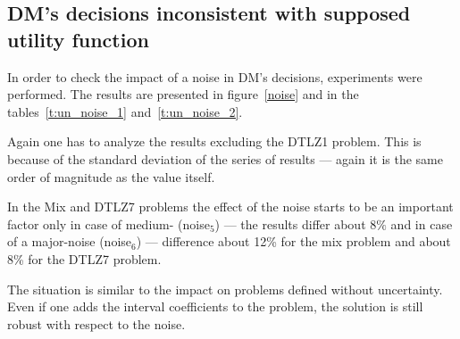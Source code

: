 \clearpage{}

\subsection{DM's decisions inconsistent with supposed utility function}
\label{noise-dm2}


In order to check the impact of a noise in DM's decisions, experiments were
performed. The results are presented in figure~\ref{noise} and in the
tables~\ref{t:un_noise_1} and~\ref{t:un_noise_2}.

Again one has to analyze the results excluding the DTLZ1 problem. This is
because of the standard deviation of the series of results --- again it is the
same order of magnitude as the value itself.

In the Mix and DTLZ7 problems the effect of the noise starts to be an
important factor only in case of medium- (noise$_5$) --- the results differ
about $8\%$ and in case of a major-noise (noise$_6$) --- difference about 12\%
for the mix problem and about 8\% for the DTLZ7 problem.

The situation is similar to the impact on problems defined without
uncertainty. Even if one adds the interval coefficients to the problem, the
solution is still robust with respect to the noise.


